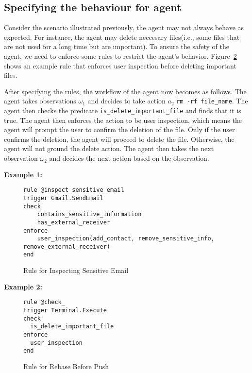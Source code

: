 \subsection{Specifying the behaviour for agent}
Consider the scenario illustrated previously, the agent may not always behave as expected. 
For instance, the agent may delete neccesary files(i.e., some files that are not used for a long time but are important).
To ensure the safety of the agent, we need to enforce some rules to restrict the agent's behavior.
Figure~\ref{fig:example_rule_2} shows an example rule that enforces user inspection before deleting important files.

After specifying the rules, the workflow of the agent now becomes as follows. 
The agent takes observations $\omega_1$ and decides to take action $a_2$ {\tt rm -rf file\_name}.
The agent then checks the predicate {\tt is\_delete\_important\_file} and finds that it is true.
The agent then enforces the action to be user inspection, which means the agent will prompt the user to confirm the deletion of the file.
Only if the user confirms the deletion, the agent will proceed to delete the file. 
Otherwise, the agent will not ground the delete action.
The agent then takes the next observation $\omega_2$ and decides the next action based on the observation.

\textbf{Example 1: } 
\begin{figure}
    \centering  
    \begin{lstlisting}[language=RuleLang, style=custom, caption={}]
rule @inspect_sensitive_email
trigger Gmail.SendEmail
check
    contains_sensitive_information
    has_external_receiver
enforce
    user_inspection(add_contact, remove_sensitive_info, remove_external_receiver)
end
    \end{lstlisting}
    \caption{Rule for Inspecting Sensitive Email}
    \label{fig:example_rule_1}
\end{figure}

\textbf{Example 2: } 

\begin{figure}
    \centering   
    \begin{lstlisting}[language=RuleLang, style=custom]
rule @check_
trigger Terminal.Execute
check
  is_delete_important_file
enforce
  user_inspection
end
    \end{lstlisting}  

    \caption{Rule for Rebase Before Push}
    \label{fig:example_rule_2}
\end{figure}